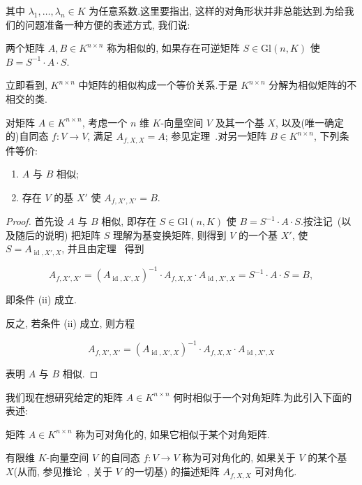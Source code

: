 其中 $\lambda_1, \ldots, \lambda_n \in K$ 为任意系数.这里要指出, 这样的对角形状并非总能达到.为给我们的问题准备一种方便的表述方式, 我们说:

\begin{definition}[相似矩阵]\label{def:6.1.1}
两个矩阵 $A, B \in K^{n \times n}$ 称为相似的, 如果存在可逆矩阵 $S \in \mathrm{Gl}(n, K)$ 使 $B = S^{-1} \cdot A \cdot S$.
\end{definition}

立即看到, $K^{n \times n}$ 中矩阵的相似构成一个等价关系.于是 $K^{n \times n}$ 分解为相似矩阵的不相交的类.

\begin{remark}\label{rem:6.1.2}
对矩阵 $A \in K^{n \times n}$, 考虑一个 $n$ 维 $K$-向量空间 $V$ 及其一个基 $X$, 以及(唯一确定的)自同态 $f \colon V \longrightarrow V$, 满足 $A_{f, X, X} = A$; 参见定理~.对另一矩阵 $B \in K^{n \times n}$, 下列条件等价:
\begin{enumerate}
\item[(i)] $A$ 与 $B$ 相似;
\item[(ii)] 存在 $V$ 的基 $X'$ 使 $A_{f, X', X'} = B$.
\end{enumerate}
\end{remark}

\begin{proof}
首先设 $A$ 与 $B$ 相似, 即存在 $S \in \mathrm{Gl}(n, K)$ 使 $B = S^{-1} \cdot A \cdot S$.按注记~(以及随后的说明) 把矩阵 $S$ 理解为基变换矩阵, 则得到 $V$ 的一个基 $X'$, 使 $S = A_{\operatorname{id}, X', X}$, 并且由定理~ 得到

\[
A_{f, X', X'} = (A_{\operatorname{id}, X', X})^{-1} \cdot A_{f, X, X} \cdot A_{\operatorname{id}, X', X} = S^{-1} \cdot A \cdot S = B,\]

即条件 (ii) 成立.

反之, 若条件 (ii) 成立, 则方程

\[
A_{f, X', X'} = (A_{\operatorname{id}, X', X})^{-1} \cdot A_{f, X, X} \cdot A_{\operatorname{id}, X', X}\]

表明 $A$ 与 $B$ 相似.
\end{proof}

我们现在想研究给定的矩阵 $A \in K^{n \times n}$ 何时相似于一个对角矩阵.为此引入下面的表述:

\begin{definition}[可对角化]\label{def:6.1.3}
矩阵 $A \in K^{n \times n}$ 称为可对角化的, 如果它相似于某个对角矩阵.

有限维 $K$-向量空间 $V$ 的自同态 $f \colon V \longrightarrow V$ 称为可对角化的, 如果关于 $V$ 的某个基 $X$(从而, 参见推论~, 关于 $V$ 的一切基) 的描述矩阵 $A_{f, X, X}$ 可对角化.
\end{definition}

